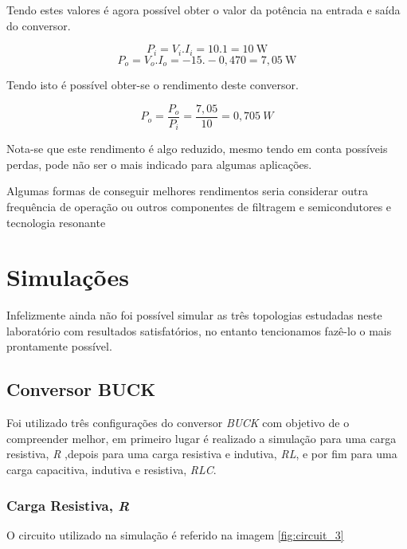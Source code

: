 \documentclass[a4paper,11pt]{article}
\numberwithin{equation}{section}
\begin{document}
Tendo estes valores é agora possível obter o valor da potência na entrada e saída do conversor.

\begin{equation}
P_i = V_i . I_i = 10 . 1 = 10  ~ \text{W}
\end{equation}
\vspace{-0,8 cm}
\begin{equation}
P_o = V_o . I_o = -15 . -0,470 = 7,05  ~ \text{W}
\end{equation}

Tendo isto é possível obter-se o rendimento deste conversor.

\begin{equation}
P_o = \frac{P_o}{P_i} = \frac{7,05}{10} = 0,705 ~ W
\end{equation}

Nota-se que este rendimento é algo reduzido, mesmo tendo em conta possíveis perdas, pode não ser o mais indicado para algumas aplicações.

Algumas formas de conseguir melhores rendimentos seria considerar outra frequência de operação ou outros componentes de filtragem e semicondutores e tecnologia resonante 

\pagebreak

\section{Simulações}

Infelizmente ainda não foi possível simular as três topologias estudadas neste laboratório com resultados satisfatórios, no entanto tencionamos fazê-lo o mais prontamente possível.

\subsection{Conversor BUCK}
Foi utilizado três configurações do conversor \textit{BUCK} com objetivo de o compreender melhor, em primeiro lugar é realizado a simulação para uma carga resistiva, \textit{R} ,depois para uma carga resistiva e indutiva, \textit{RL}, e por fim para uma carga capacitiva, indutiva e resistiva, \textit{RLC}.
\subsubsection{Carga Resistiva, \textit{R}}
O circuito utilizado na simulação é referido na imagem \autoref{fig:circuit_3}
\end{document}
